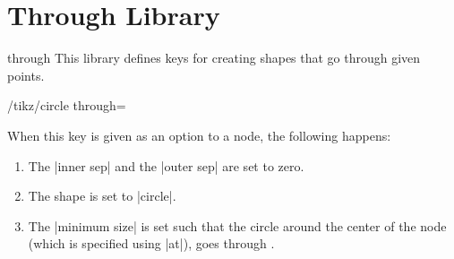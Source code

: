 %
%
%


\section{Through Library}

\label{section-through-library}


\begin{tikzlibrary}{through}
  This library defines keys for creating shapes that go through given
  points.
\end{tikzlibrary}


\begin{key}{/tikz/circle through=}

  When this key is given as an option to a node, the following
  happens:
  \begin{enumerate}
  \item The |inner sep| and the |outer sep| are set to zero.
  \item The shape is set to |circle|.
  \item The |minimum size| is set such that the circle around the
    center of the node (which is specified using |at|), goes through
    .
  \end{enumerate}
\begin{codeexample}[]
\end{codeexample}
\end{key}



